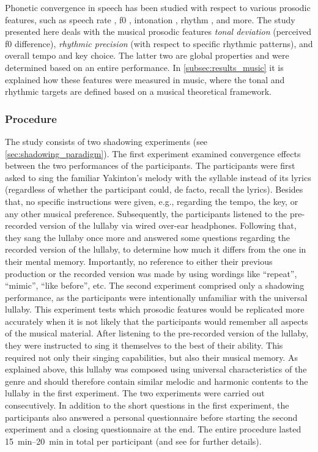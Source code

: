 Phonetic convergence in speech has been studied with respect to various prosodic features, such as speech rate \citep{Schweitzer2013convergence, Pardo2012phonetic}, \ac{f0} \citep{Babel2012role, Collins1998convergence}, intonation \citep{DImperio2014phonetic, Simonet2011intonational}, rhythm \citep{Krivokapic2013rhythm}, and more.
The study presented here deals with the musical prosodic features \emph{tonal deviation} (perceived \ac{f0} difference), \emph{rhythmic precision} (with respect to specific rhythmic patterns), and overall tempo and key choice.
The latter two are global properties and were determined based on an entire performance.
In \cref{subsec:results_music} it is explained how these features were measured in music, where the tonal and rhythmic targets are defined based on a musical theoretical framework.

\subsubsection{Procedure}
\label{subsubsec:procedure_music}

The study consists of two shadowing experiments (see \cref{sec:shadowing_paradigm}).
The first experiment examined convergence effects between the two performances of the participants.
The participants were first asked to sing the familiar Yakinton's melody with the syllable \textipa{[na]} instead of its lyrics (regardless of whether the participant could, de facto, recall the lyrics).
Besides that, no specific instructions were given, e.g., regarding the tempo, the key, or any other musical preference.
Subsequently, the participants listened to the pre-recorded version of the lullaby via wired over-ear headphones.%
Following that, they sang the lullaby once more and answered some questions regarding the recorded version of the lullaby, to determine how much it differs from the one in their mental memory.
Importantly, no reference to either their previous production or the recorded version was made by using wordings like \enquote{repeat}, \enquote{mimic}, \enquote{like before}, etc.
The second experiment comprised only a shadowing performance, as the participants were intentionally unfamiliar with the universal lullaby.
This experiment tests which prosodic features would be replicated more accurately when it is not likely that the participants would remember all aspects of the musical material.
After listening to the pre-recorded version of the lullaby, they were instructed to sing it themselves to the best of their ability.
This required not only their singing capabilities, but also their musical memory.
As explained above, this lullaby was composed using universal characteristics of the genre and should therefore contain similar melodic and harmonic contents to the lullaby in the first experiment.
The two experiments were carried out consecutively.
In addition to the short questions in the first experiment, the participants also answered a personal questionnaire before starting the second experiment and a closing questionnaire at the end.
The entire procedure lasted \SIrange{15}{20}{\minute} in total per participant (and see \citet{Raveh2020SpeechProsody} for further details).


